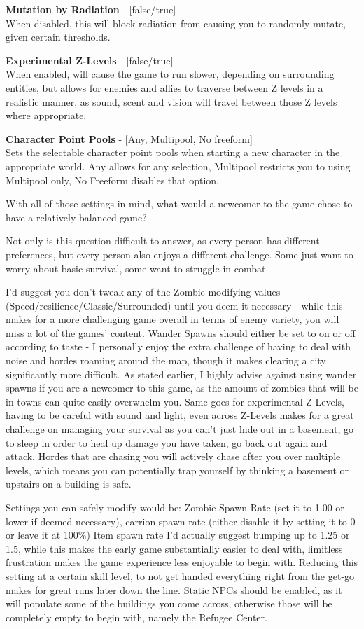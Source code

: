 \textbf{Mutation by Radiation} - [false/true]\\When disabled, this will block radiation from causing you to randomly mutate, given certain thresholds.

\textbf{Experimental Z-Levels} - [false/true]\\When enabled, will cause the game to run slower, depending on surrounding entities, but allows for enemies and allies to traverse between Z levels in a realistic manner, as sound, scent and vision will travel between those Z levels where appropriate.

\textbf{Character Point Pools} - [Any, Multipool, No freeform]\\Sets the selectable character point pools when starting a new character in the appropriate world. Any allows for any selection, Multipool restricts you to using Multipool only, No Freeform disables that option.

With all of those settings in mind, what would a newcomer to the game chose to have a relatively balanced game?

Not only is this question difficult to answer, as every person has different preferences, but every person also enjoys a different challenge. Some just want to worry about basic survival, some want to struggle in combat.

I'd suggest you don't tweak any of the Zombie modifying values (Speed/resilience/Classic/Surrounded) until you deem it necessary - while this makes for a more challenging game overall in terms of enemy variety, you will miss a lot of the games' content. Wander Spawns should either be set to on or off according to taste - I personally enjoy the extra challenge of having to deal with noise and hordes roaming around the map, though it makes clearing a city significantly more difficult. As stated earlier, I highly advise against using wander spawns if you are a newcomer to this game, as the amount of zombies that will be in towns can quite easily overwhelm you. Same goes for experimental Z-Levels, having to be careful with sound and light, even across Z-Levels makes for a great challenge on managing your survival as you can't just hide out in a basement, go to sleep in order to heal up damage you have taken, go back out again and attack. Hordes that are chasing you will actively chase after you over multiple levels, which means you can potentially trap yourself by thinking a basement or upstairs on a building is safe.

Settings you can safely modify would be: Zombie Spawn Rate (set it to 1.00 or lower if deemed necessary), carrion spawn rate (either disable it by setting it to 0 or leave it at 100\%) Item spawn rate I'd actually suggest bumping up to 1.25 or 1.5, while this makes the early game substantially easier to deal with, limitless frustration makes the game experience less enjoyable to begin with. Reducing this setting at a certain skill level, to not get handed everything right from the get-go makes for great runs later down the line. Static NPCs should be enabled, as it will populate some of the buildings you come across, otherwise those will be completely empty to begin with, namely the Refugee Center.


